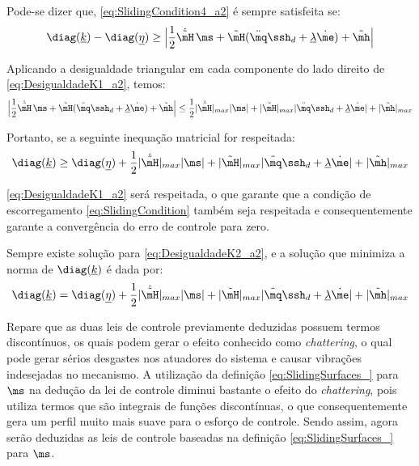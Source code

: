 \documentclass[]{politex}
\begin{document}
\begin{itemize}
\begin{itemize}
Pode-se dizer que, \eqref{eq:SlidingCondition4_a2} \'e sempre satisfeita se:
\begin{equation} \label{eq:DesigualdadeK1_a2}
 \diag(\underline{k}) - \diag(\underline{\eta}) \geq  \Big| \frac{1}{2} \dot{\tilde{\mH}} \, \ms + \tilde{\mH}(\ddot{\mq}\ssh_d + \underline{\lambda} \dot{\me}) + \tilde{\mh} \Big|
\end{equation}

Aplicando a desigualdade triangular em cada componente do lado direito de \eqref{eq:DesigualdadeK1_a2}, temos:
\begin{equation}
\Big| \frac{1}{2} \dot{\tilde{\mH}} \, \ms + \tilde{\mH}(\ddot{\mq}\ssh_d + \underline{\lambda} \dot{\me}) + \tilde{\mh} \Big| \leq  \frac{1}{2}|\dot{\tilde{\mH}}|_{max} |\ms| + |\tilde{\mH}|_{max} |\ddot{\mq}\ssh_d + \underline{\lambda} \dot{\me}| + |\tilde{\mh}|_{max}
\end{equation}

Portanto, se a seguinte inequa\c{c}\~ao matricial for respeitada:
\begin{equation} \label{eq:DesigualdadeK2_a2}
\diag(\underline{k})  \geq \diag(\underline{\eta}) + \frac{1}{2}|\dot{\tilde{\mH}}|_{max} |\ms| + |\tilde{\mH}|_{max} |\ddot{\mq}\ssh_d + \underline{\lambda} \dot{\me}| + |\tilde{\mh}|_{max}
\end{equation}

\eqref{eq:DesigualdadeK1_a2} ser\'a respeitada, o que garante que a condi\c{c}\~ao de escorregamento \eqref{eq:SlidingCondition} tamb\'em seja respeitada e consequentemente garante a converg\^encia do erro de controle para zero.

Sempre existe solu\c{c}\~ao para \eqref{eq:DesigualdadeK2_a2}, e a solução que minimiza a norma de $\diag(\underline{k})$ é dada por:
\begin{equation} \label{eq:MatrizDiagk_a2}
\diag(\underline{k})  = \diag(\underline{\eta}) + \frac{1}{2}|\dot{\tilde{\mH}}|_{max} |\ms| + |\tilde{\mH}|_{max} |\ddot{\mq}\ssh_d + \underline{\lambda} \dot{\me}| + |\tilde{\mh}|_{max}
\end{equation}

\end{itemize}

Repare que as duas leis de controle previamente deduzidas possuem termos discontínuos, os quais podem gerar o efeito conhecido como \emph{chattering}, o qual pode gerar sérios desgastes nos atuadores do sistema e causar vibrações indesejadas no mecanismo. A utilização da definição \eqref{eq:SlidingSurfaces_} para $\ms$ na dedução da lei de controle diminui bastante o efeito do \emph{chattering}, pois utiliza termos que são integrais de funções discontínuas, o que consequentemente gera um perfil muito mais suave para o esforço de controle. Sendo assim, agora serão deduzidas as leis de controle baseadas na definição \eqref{eq:SlidingSurfaces_} para $\ms$.


\end{itemize}
\end{document}
